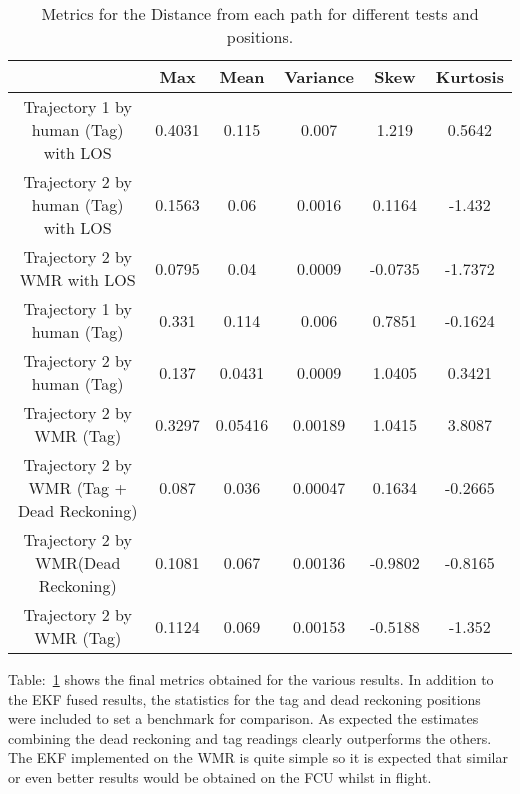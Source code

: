 \begin{table}[ht!]
    \centering
    \begin{tabular}{|c|c|c|c|c|c|}
        \hline
        & Max & Mean & Variance & Skew & Kurtosis \\
        \hline
        \rowcolor{LightNavy}Trajectory 1 by human (Tag) with LOS & 0.4031 & 0.115 & 0.007 & 1.219& 0.5642\\
        \hline
        \rowcolor{LightNavy}Trajectory 2 by human (Tag) with LOS & 0.1563 & 0.06 & 0.0016 &0.1164 & -1.432\\
        \hline
        \rowcolor{LightNavy}Trajectory 2 by WMR with LOS & 0.0795 & 0.04 & 0.0009 & -0.0735 & -1.7372\\
        \hline
        Trajectory 1 by human (Tag) & 0.331 & 0.114 & 0.006 & 0.7851 & -0.1624\\
        \hline
        Trajectory 2 by human (Tag) & 0.137 & 0.0431& 0.0009 & 1.0405 & 0.3421\\
        \hline
        Trajectory 2 by WMR (Tag) &  0.3297 & 0.05416 & 0.00189 & 1.0415 & 3.8087\\
        \hline
        \rowcolor{LightGreen}Trajectory 2 by WMR (Tag + Dead Reckoning)& 0.087 & 0.036 & 0.00047 & 0.1634 & -0.2665\\
        \hline
        Trajectory 2 by WMR(Dead Reckoning)& 0.1081 & 0.067 & 0.00136 & -0.9802 & -0.8165\\
        \hline
        Trajectory 2 by WMR (Tag) & 0.1124 & 0.069 & 0.00153 & -0.5188 & -1.352\\
        \hline
    \end{tabular}
    \caption{Metrics for the Distance from each path for different tests and positions.}
    \label{tb:results}
\end{table}

Table:~\ref{tb:results} shows the final metrics obtained for the various results.
In addition to the EKF fused results, the statistics for the tag and dead reckoning positions were included to set a benchmark for comparison.
As expected the estimates combining the dead reckoning and tag readings clearly outperforms the others.
The EKF implemented on the WMR is quite simple so it is expected that similar or even better results would be obtained on the FCU whilst in flight.